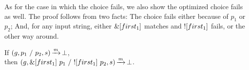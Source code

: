 As for the case in which the choice fails,
we also show the optimized choice fails as well.
The proof follows from two facts:
The choice fails either because of $p_1$ or $p_2$;
And, for any input string,
either $\&[first_1]$ matches
and $![first_1]$ fails,
or the other way around.

\begin{lemma}
If $(g,p_1\ /\ p_2,s) \operatorname{\xrightarrow{\mathit{m}}} \operatorname{\bot}$, \\
then $(g,\&[first_1]\ p_1\ /\ ![first_1]\ p_2,s) \operatorname{\xrightarrow{\mathit{m}}} \operatorname{\bot}$.
\end{lemma}